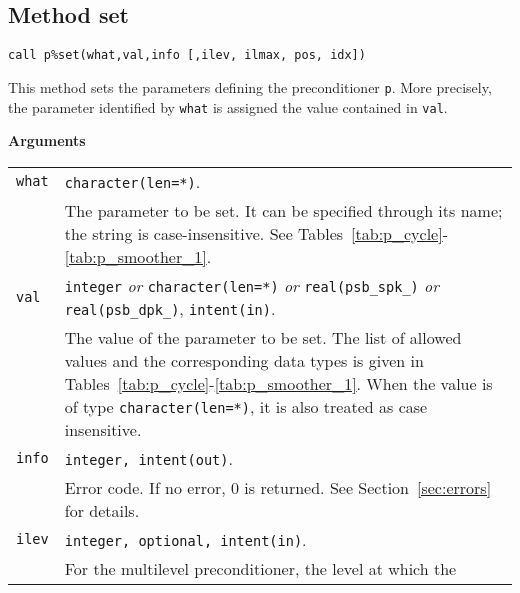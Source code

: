 \clearpage

\subsection{Method set\label{sec:precset}}

\begin{center}
\verb|call p%set(what,val,info [,ilev, ilmax, pos, idx])|
\end{center}

\noindent
This method sets the parameters defining the preconditioner \verb|p|. More
precisely, the parameter identified by \verb|what| is assigned the value
contained in \verb|val|. 

{\baselineskip\noindent\large\bfseries Arguments} \smallskip

\begin{tabular}{p{1.2cm}p{12cm}}
\verb|what|   & \verb|character(len=*)|. \\
              & The parameter to be set. It can be specified through its name;
                the string is case-insensitive. See
                Tables~\ref{tab:p_cycle}-\ref{tab:p_smoother_1}.\\ 
\verb|val |   & \verb|integer| \emph{or} \verb|character(len=*)| \emph{or}
                \verb|real(psb_spk_)| \emph{or} \verb|real(psb_dpk_)|,
                \verb|intent(in)|.\\
              & The value of the parameter to be set. The list of allowed
                values and the corresponding data types is given in
                Tables~\ref{tab:p_cycle}-\ref{tab:p_smoother_1}.
                When the value is of type \verb|character(len=*)|,
                it is also treated as case insensitive.\\
\verb|info|   & \verb|integer, intent(out)|.\\
              & Error code. If no error, 0 is returned. See Section~\ref{sec:errors}
                for details.\\
\verb|ilev|   & \verb|integer, optional, intent(in)|.\\
              & For the multilevel preconditioner, the level at which the

\end{tabular}
